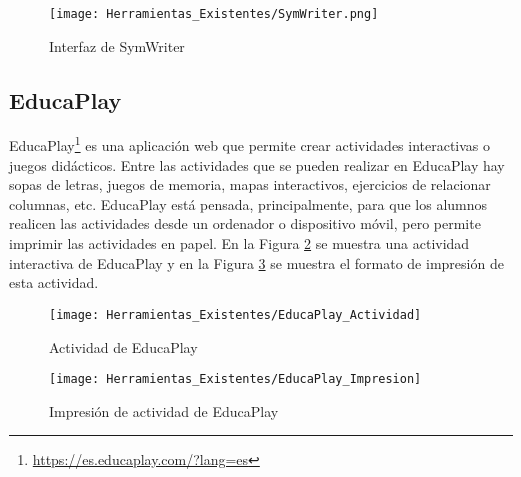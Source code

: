 \begin{figure}[ht!]
    \centering
    \texttt{[image: Herramientas\_Existentes/SymWriter.png]}
    \caption{Interfaz de SymWriter}
    \label{fig:SymWriter}
\end{figure}

\subsection{EducaPlay}
EducaPlay\footnote{\url{https://es.educaplay.com/?lang=es}} es una aplicación web que permite crear actividades interactivas o juegos didácticos. Entre las actividades que se pueden realizar en EducaPlay hay sopas de letras, juegos de memoria, mapas interactivos, ejercicios de relacionar columnas, etc. EducaPlay está pensada, principalmente, para que los alumnos realicen las actividades desde un ordenador o dispositivo móvil, pero permite imprimir las actividades en papel. En la Figura \ref{fig:EducaPlay_Actividad} se muestra una actividad interactiva de EducaPlay y en la Figura \ref{fig:EducaPlay_Impresion} se muestra el formato de impresión de esta actividad.

\begin{figure}[ht!]
    \centering
    \texttt{[image: Herramientas\_Existentes/EducaPlay\_Actividad]}
    \caption{Actividad de EducaPlay}
    \label{fig:EducaPlay_Actividad}
\end{figure}

\begin{figure}[ht!]
    \centering
    \texttt{[image: Herramientas\_Existentes/EducaPlay\_Impresion]}
    \caption{Impresión de actividad de EducaPlay}
    \label{fig:EducaPlay_Impresion}
\end{figure}

